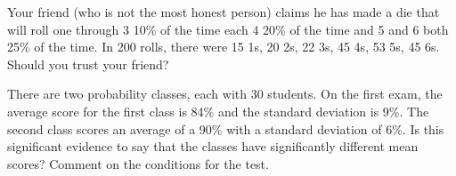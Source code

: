 \begin{exe} Your friend (who is not the most honest person) claims he has made a die that will roll one through 3 10\% of the time each 4 20\% of the time and 5 and 6 both 25\% of the time.  In 200 rolls, there were 15 1s, 20 2s, 22 3s, 45 4s, 53 5s, 45 6s. Should you trust your friend? \end{exe}



\begin{exe} There are two probability classes, each with 30 students.  On the first exam, the average score for the first class is 84\% and the standard deviation is 9\%.  The second class scores an average of a 90\% with a standard deviation of 6\%.  Is this significant evidence to say that the classes have significantly different mean scores?  Comment on the conditions for the test. \end{exe}

